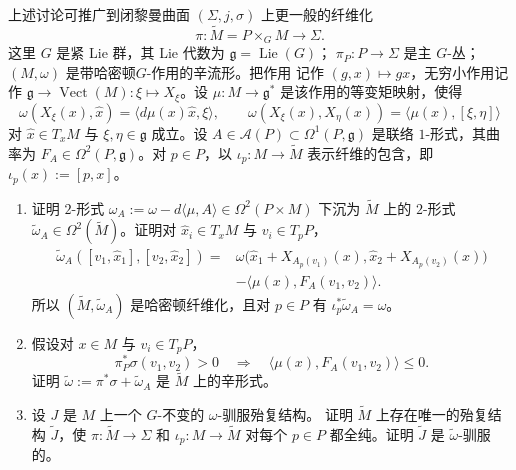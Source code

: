 \begin{exercise}\label{ex:9-2-15}
上述讨论可推广到闭黎曼曲面 $(\Sigma,j,\sigma)$ 上更一般的纤维化
\[
  \pi:\widetilde M=P\times_GM\longrightarrow\Sigma.
\]
这里 $G$ 是紧 Lie 群，其 Lie 代数为 $\mathfrak g=\operatorname{Lie}(G)$；
$\pi_P:P\to\Sigma$ 是主 $G$-丛；$(M,\omega)$ 是带哈密顿$G$-作用的辛流形。把作用
记作 $(g,x)\mapsto gx$，无穷小作用记作
$\mathfrak g\to\operatorname{Vect}(M):\xi\mapsto X_\xi$。设
$\mu:M\to\mathfrak g^*$ 是该作用的等变矩映射，使得
\[
  \omega(X_\xi(x),\widehat x)
  =\langle d\mu(x)\widehat x,\xi\rangle,
  \qquad
  \omega(X_\xi(x),X_\eta(x))
  =\langle\mu(x),[\xi,\eta]\rangle
\]
对 $\widehat x\in T_xM$ 与 $\xi,\eta\in\mathfrak g$ 成立。设
$A\in\mathcal A(P)\subset\Omega^1(P,\mathfrak g)$ 是联络 $1$-形式，其曲率为
$F_A\in\Omega^2(P,\mathfrak g)$。对 $p\in P$，以
$\iota_p:M\to\widetilde M$ 表示纤维的包含，即 $\iota_p(x):=[p,x]$。

\begin{enumerate}[label=\arabic*.]
\item 证明 $2$-形式
$\omega_A:=\omega-d\langle\mu,A\rangle\in\Omega^2(P\times M)$ 下沉为
$\widetilde M$ 上的 $2$-形式
$\widetilde\omega_A\in\Omega^2(\widetilde M)$。证明对
$\widehat x_i\in T_xM$ 与 $v_i\in T_pP$，
\[
\begin{aligned}
  \widetilde\omega_A([v_1,\widehat x_1],[v_2,\widehat x_2])
  ={}&\omega\bigl(\widehat x_1+X_{A_p(v_1)}(x),
                   \widehat x_2+X_{A_p(v_2)}(x)\bigr)\\
     &-\langle\mu(x),F_A(v_1,v_2)\rangle.
\end{aligned}
\]
所以 $(\widetilde M,\widetilde\omega_A)$ 是哈密顿纤维化，且对 $p\in P$ 有
$\iota_p^*\widetilde\omega_A=\omega$。

\item 假设对 $x\in M$ 与 $v_i\in T_pP$，
\begin{equation}\label{eq:9-2-7}
  \pi_P^*\sigma(v_1,v_2)>0
  \quad\Longrightarrow\quad
  \langle\mu(x),F_A(v_1,v_2)\rangle\le0.
\end{equation}
证明 $\widetilde\omega:=\pi^*\sigma+\widetilde\omega_A$ 是 $\widetilde M$ 上的辛形式。

\item 设 $J$ 是 $M$ 上一个 $G$-不变的 $\omega$-驯服殆复结构。
证明 $\widetilde M$ 上存在唯一的殆复结构 $\widetilde J$，使
$\pi:\widetilde M\to\Sigma$ 和 $\iota_p:M\to\widetilde M$ 对每个 $p\in P$ 都全纯。证明
$\widetilde J$ 是 $\widetilde\omega$-驯服的。


\end{enumerate}
\end{exercise}
